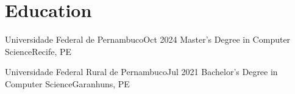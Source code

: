 \section{Education}
    \resumeSubHeadingListStart

    \resumeSubheading
    {Universidade Federal de Pernambuco}{Oct 2024}
    {Master's Degree in Computer Science}{Recife, PE}

    \resumeSubheading
    {Universidade Federal Rural de Pernambuco}{Jul 2021}
    {Bachelor's Degree in Computer Science}{Garanhuns, PE}
    \resumeItemListStart
    \resumeItemListEnd

    \resumeSubHeadingListEnd